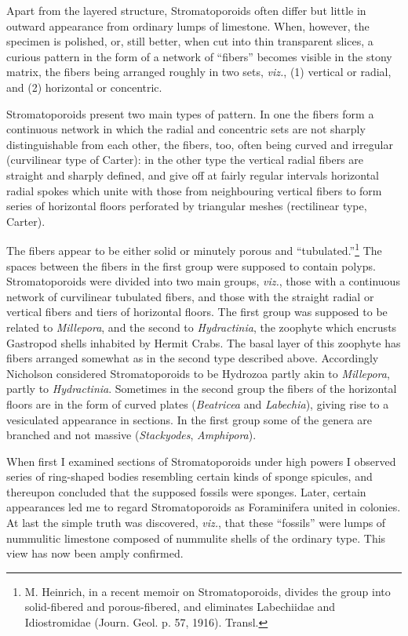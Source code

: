 \documentclass[a4paper, 12pt, oneside]{article}
\begin{document}
Apart from the layered structure, Stromatoporoids often differ but little in outward appearance from ordinary lumps of limestone. When, however, the specimen is polished, or, still better, when cut into thin transparent slices, a curious pattern in the form of a network of ``fibers'' becomes visible in the stony matrix, the fibers being arranged roughly in two sets, \emph{viz.}, (1) vertical or radial, and (2) horizontal or concentric.

Stromatoporoids present two main types of pattern. In one the fibers form a continuous network in which the radial and concentric sets are not sharply distinguishable from each other, the fibers, too, often being curved and irregular (curvilinear type of Carter): in the other type the vertical radial fibers are straight and sharply defined, and give off at fairly regular intervals horizontal radial spokes which unite with those from neighbouring vertical fibers to form series of horizontal floors perforated by triangular meshes (rectilinear type, Carter).

The fibers appear to be either solid or minutely porous and ``tubulated.''\footnote{M. Heinrich, in a recent memoir on Stromatoporoids, divides the group into solid-fibered and porous-fibered, and eliminates Labechiidae and Idiostromidae (Journ. Geol. p. 57, 1916). Transl.} The spaces between the fibers in the first group were supposed to contain polyps. Stromatoporoids were divided into two main groups, \emph{viz.}, those with a continuous network of curvilinear tubulated fibers, and those with the straight radial or vertical fibers and tiers of horizontal floors. The first group was supposed to be related to \emph{Millepora}, and the second to \emph{Hydractinia}, the zoophyte which encrusts Gastropod shells inhabited by Hermit Crabs. The basal layer of this zoophyte has fibers arranged somewhat as in the second type described above. Accordingly Nicholson considered Stromatoporoids to be Hydrozoa partly akin to \emph{Millepora}, partly to \emph{Hydractinia}. Sometimes in the second group the fibers of the horizontal floors are in the form of curved plates (\emph{Beatricea} and \emph{Labechia}), giving rise to a vesiculated appearance in sections. In the first group some of the genera are branched and not massive (\emph{Stackyodes}, \emph{Amphipora}).

When first I examined sections of Stromatoporoids under high powers I observed series of ring-shaped bodies resembling certain kinds of sponge spicules, and thereupon concluded that the supposed fossils were sponges. Later, certain appearances led me to regard Stromatoporoids as Foraminifera united in colonies. At last the simple truth was discovered, \emph{viz.}, that these ``fossils'' were lumps of nummulitic limestone composed of nummulite shells of the ordinary type. This view has now been amply confirmed.
\end{document}
